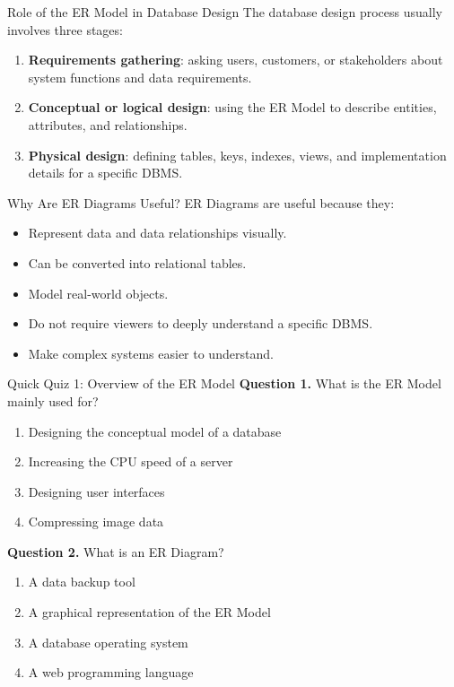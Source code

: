 \documentclass[aspectratio=169,11pt]{beamer}
\newcommand{\keyword}[1]{\textcolor{accent}{\textbf{#1}}}
\newcommand{\kw}[1]{\keyword{#1}}
\newcommand{\tightlist}{\setlength{\itemsep}{2pt}\setlength{\parskip}{0pt}}
\newcommand{\smallitem}{\setlength{\itemsep}{2pt}\setlength{\parskip}{0pt}}
\newcommand{\qoption}[2]{\item[#1.] #2}
\begin{document}
\begin{frame}{Role of the ER Model in Database Design}
\small
The database design process usually involves three stages:
\begin{enumerate}
\smallitem
  \item \kw{Requirements gathering}: asking users, customers, or stakeholders about system functions and data requirements.
  \item \kw{Conceptual or logical design}: using the ER Model to describe entities, attributes, and relationships.
  \item \kw{Physical design}: defining tables, keys, indexes, views, and implementation details for a specific DBMS.
\end{enumerate}
\end{frame}

\begin{frame}{Why Are ER Diagrams Useful?}
\small
ER Diagrams are useful because they:
\begin{itemize}
\smallitem
  \item Represent data and data relationships visually.
  \item Can be converted into relational tables.
  \item Model real-world objects.
  \item Do not require viewers to deeply understand a specific DBMS.
  \item Make complex systems easier to understand.
\end{itemize}
\end{frame}

\begin{frame}{Quick Quiz 1: Overview of the ER Model}
\small
\textbf{Question 1.} What is the ER Model mainly used for?
\begin{enumerate}
\tightlist
  \qoption{A}{Designing the conceptual model of a database}
  \qoption{B}{Increasing the CPU speed of a server}
  \qoption{C}{Designing user interfaces}
  \qoption{D}{Compressing image data}
\end{enumerate}

\textbf{Question 2.} What is an ER Diagram?
\begin{enumerate}
\tightlist
  \qoption{A}{A data backup tool}
  \qoption{B}{A graphical representation of the ER Model}
  \qoption{C}{A database operating system}
  \qoption{D}{A web programming language}
\end{enumerate}
\end{frame}
\end{document}
